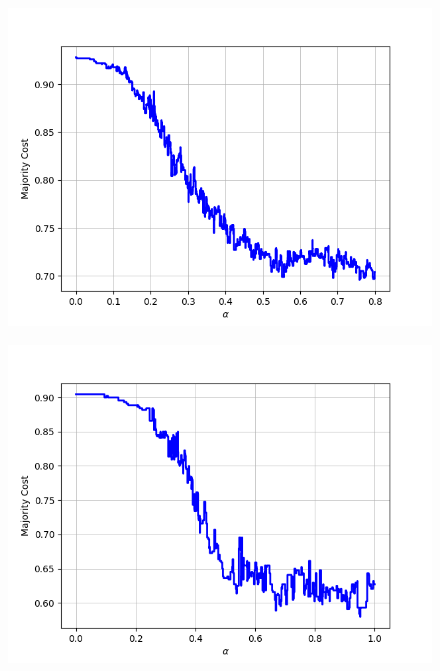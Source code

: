 \begin{figure}[H]
\begin{minipage}{.24\textwidth}
  {\includegraphics[width=\linewidth]{plots/omniglot-intra-sc-cnn/Greek}}
\end{minipage}
\begin{minipage}{.24\textwidth}
  \centering
  {\includegraphics[width=\linewidth]{plots/omniglot-intra-sc-cnn/Gujarati}}
\end{minipage}
\begin{minipage}{.24\textwidth}
  \centering

\end{minipage}
\end{figure}
